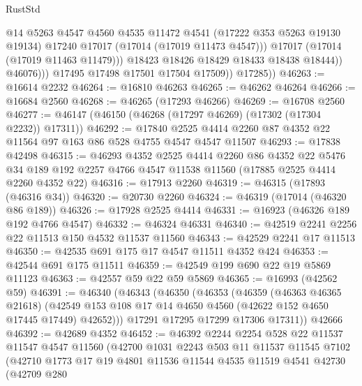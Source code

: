 \begin{lexlean}{RustStd}
\begin{coremodule}
                          @14
                          @5263
                          @4547
                          @4560
                          @4535
                          @11472
                          @4541
                          (@17222 @353 @5263 @19130 @19134)
                          @17240
                          @17017
                          (@17014 (@17019 @11473 @4547)))
                        @17017
                        (@17014 (@17019 @11463 @11479)))
                      @18423
                      @18426
                      @18429
                      @18433
                      @18438
                      @18444))
                  @46076)))
            @17495
            @17498
            @17501
            @17504
            @17509))
        @17285))
@46263 := @16614 @2232
@46264 := @16810 @46263
@46265 := @46262 @46264
@46266 := @16684 @2560
@46268 := @46265 (@17293 @46266)
@46269 := @16708 @2560
@46277 := @46147 (@46150 (@46268 (@17297 @46269) (@17302 (@17304 @2232)) @17311))
@46292 := @17840 @2525 @4414 @2260 @87 @4352 @22 @11564 @97 @163 @86 @528 @4755 @4547 @4547 @11507
@46293 := @17838 @42498
@46315 := @46293
    @4352
    @2525
    @4414
    @2260
    @86
    @4352
    @22
    @5476
    @34
    @189
    @192
    @2257
    @4766
    @4547
    @11538
    @11560
    (@17885 @2525 @4414 @2260 @4352 @22)
@46316 := @17913 @2260
@46319 := @46315 (@17893 (@46316 @34))
@46320 := @20730 @2260
@46324 := @46319 (@17014 (@46320 @86 @189))
@46326 := @17928 @2525 @4414
@46331 := @16923 (@46326 @189 @192 @4766 @4547)
@46332 := @46324 @46331
@46340 := @42519 @2241 @2256 @22 @11513 @150 @4532 @11537 @11560
@46343 := @42529 @2241 @17 @11513
@46350 := @42535 @691 @175 @17 @4547 @11511 @4352 @424
@46353 := @42544 @691 @175 @11511
@46359 := @42549 @199 @690 @22 @19 @5869 @11123
@46363 := @42557 @59 @22 @59 @5869
@46365 := @16993 (@42562 @59)
@46391 := @46340
    (@46343
      (@46350
        (@46353
          (@46359
            (@46363 @46365 @21618)
            (@42549 @153 @108 @17 @14 @4650 @4560 (@42622 @152 @4650 @17445 @17449) @42652)))
        @17291
        @17295
        @17299
        @17306
        @17311))
    @42666
@46392 := @42689 @4352
@46452 := @46392
    @2244
    @2254
    @528
    @22
    @11537
    @11547
    @4547
    @11560
    (@42700
      @1031
      @2243
      @503
      @11
      @11537
      @11545
      @7102
      (@42710
        @1773
        @17
        @19
        @4801
        @11536
        @11544
        @4535
        @11519
        @4541
        @42730
        (@42709
          @280

\end{coremodule}
\end{lexlean}

